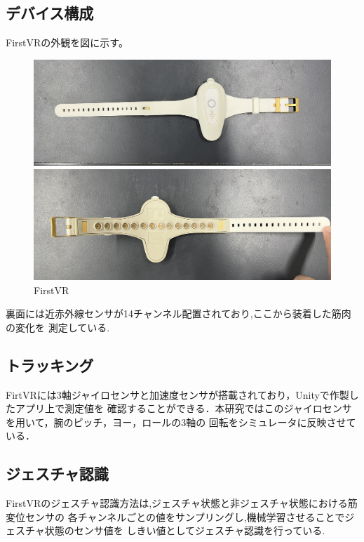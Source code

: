\documentclass{ltjsreport}
\begin{document}
		\subsection{デバイス構成}
				FirstVRの外観を図に示す。
				\begin{figure}[H]
				\centering
				\begin{minipage}{0.75\columnwidth}
				\centering
				\includegraphics[width = \columnwidth]{../figs/IMG_5130.JPG}
				\end{minipage}
				\hspace{0.04\columnwidth}
				\begin{minipage}{0.75\columnwidth}
				\centering
				\includegraphics[width = \columnwidth]{../figs/IMG_5131.JPG}
				\end{minipage}
				\caption{FirstVR}
				\label{fig:FirstVR}
				\end{figure}
			裏面には近赤外線センサが14チャンネル配置されており,ここから装着した筋肉の変化を
			測定している.
		\subsection{トラッキング}
			FirtVRには3軸ジャイロセンサと加速度センサが搭載されており，Unityで作製したアプリ上で測定値を
			確認することができる．本研究ではこのジャイロセンサを用いて，腕のピッチ，ヨー，ロールの3軸の
			回転をシミュレータに反映させている．
		\subsection{ジェスチャ認識}
			FirstVRのジェスチャ認識方法は,ジェスチャ状態と非ジェスチャ状態における筋変位センサの
			各チャンネルごとの値をサンプリングし,機械学習させることでジェスチャ状態のセンサ値を
			しきい値としてジェスチャ認識を行っている.
\end{document}
